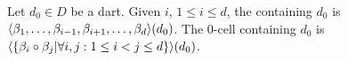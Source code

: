 Let $d_0 \in D$ be a dart. Given $i$, $1\leq i \leq d$,
the  containing $d_0$ is 
$\langle{}\beta_1,\ldots,\beta_{i-1},\beta_{i+1},\ldots,\beta_d\rangle{}(d_0)$.
The $0$-cell  containing $d_0$ is 
$\langle{}\{\beta_{i}\circ\beta_{j}|\forall i,j: 1\leq i<j \leq d\}\rangle{}(d_0)$.



